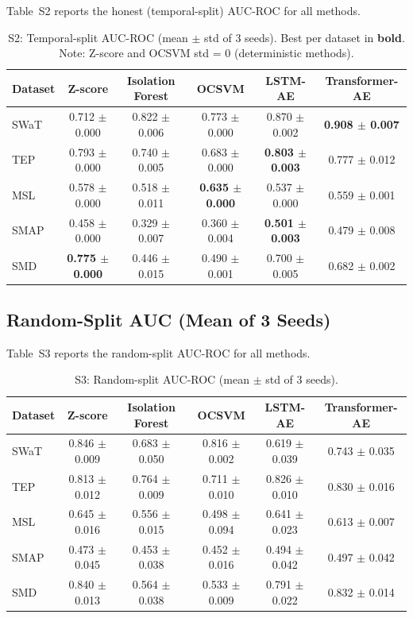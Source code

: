 \documentclass[12pt]{article}
\begin{document}
Table~S2 reports the honest (temporal-split) AUC-ROC for all methods.

\begin{table}[htbp]
\centering
\caption{S2: Temporal-split AUC-ROC (mean $\pm$ std of 3 seeds). Best per dataset in \textbf{bold}. Note: Z-score and OCSVM std = 0 (deterministic methods).}
\begin{tabular}{lccccc}
\toprule
Dataset & Z-score & Isolation Forest & OCSVM & LSTM-AE & Transformer-AE \\
\midrule
SWaT & 0.712 $\pm$ 0.000 & 0.822 $\pm$ 0.006 & 0.773 $\pm$ 0.000 & 0.870 $\pm$ 0.002 & \textbf{0.908 $\pm$ 0.007} \\
TEP  & 0.793 $\pm$ 0.000 & 0.740 $\pm$ 0.005 & 0.683 $\pm$ 0.000 & \textbf{0.803 $\pm$ 0.003} & 0.777 $\pm$ 0.012 \\
MSL  & 0.578 $\pm$ 0.000 & 0.518 $\pm$ 0.011 & \textbf{0.635 $\pm$ 0.000} & 0.537 $\pm$ 0.000 & 0.559 $\pm$ 0.001 \\
SMAP & 0.458 $\pm$ 0.000 & 0.329 $\pm$ 0.007 & 0.360 $\pm$ 0.004 & \textbf{0.501 $\pm$ 0.003} & 0.479 $\pm$ 0.008 \\
SMD  & \textbf{0.775 $\pm$ 0.000} & 0.446 $\pm$ 0.015 & 0.490 $\pm$ 0.001 & 0.700 $\pm$ 0.005 & 0.682 $\pm$ 0.002 \\
\bottomrule
\end{tabular}
\end{table}

\subsection{Random-Split AUC (Mean of 3 Seeds)}

Table~S3 reports the random-split AUC-ROC for all methods.

\begin{table}[htbp]
\centering
\caption{S3: Random-split AUC-ROC (mean $\pm$ std of 3 seeds).}
\begin{tabular}{lccccc}
\toprule
Dataset & Z-score & Isolation Forest & OCSVM & LSTM-AE & Transformer-AE \\
\midrule
SWaT & 0.846 $\pm$ 0.009 & 0.683 $\pm$ 0.050 & 0.816 $\pm$ 0.002 & 0.619 $\pm$ 0.039 & 0.743 $\pm$ 0.035 \\
TEP  & 0.813 $\pm$ 0.012 & 0.764 $\pm$ 0.009 & 0.711 $\pm$ 0.010 & 0.826 $\pm$ 0.010 & 0.830 $\pm$ 0.016 \\
MSL  & 0.645 $\pm$ 0.016 & 0.556 $\pm$ 0.015 & 0.498 $\pm$ 0.094 & 0.641 $\pm$ 0.023 & 0.613 $\pm$ 0.007 \\
SMAP & 0.473 $\pm$ 0.045 & 0.453 $\pm$ 0.038 & 0.452 $\pm$ 0.016 & 0.494 $\pm$ 0.042 & 0.497 $\pm$ 0.042 \\
SMD  & 0.840 $\pm$ 0.013 & 0.564 $\pm$ 0.038 & 0.533 $\pm$ 0.009 & 0.791 $\pm$ 0.022 & 0.832 $\pm$ 0.014 \\
\bottomrule
\end{tabular}
\end{table}
\end{document}
